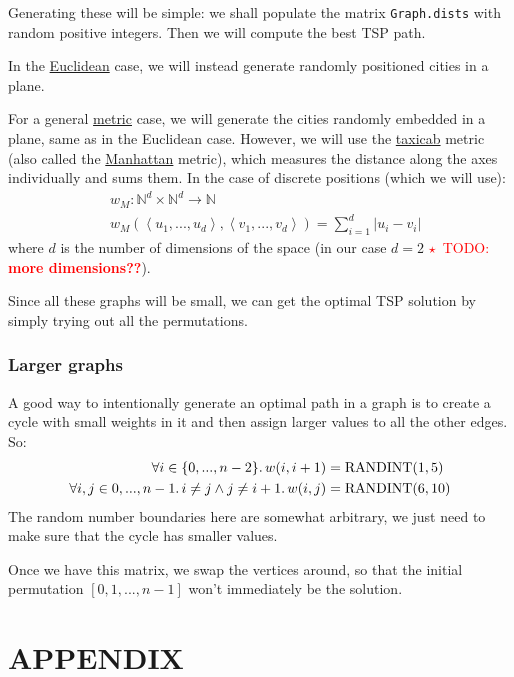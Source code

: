 \documentclass{article}
\newcommand{\todo}[1]{\textcolor{red}{$\star$~TODO: \textbf{#1}}}
\newcommand{\randint}{\operatorname{RANDINT}}
\newcommand{\uu}[1]{\underline{#1}}
\newcommand{\py}[1]{\lstinline[language=Python]{#1}}
\renewcommand{\thesection}{\Alph{section}}
\begin{document}
Generating these will be simple: we shall populate the matrix
\py{Graph.dists} with random positive integers. Then we will
compute the best TSP path.

In the \uu{Euclidean} case, we will instead generate randomly positioned
cities in a plane.

For a general \uu{metric} case, we will generate the cities randomly embedded
in a plane, same as in the Euclidean case. However, we will use
the \uu{taxicab} metric (also called the \uu{Manhattan} metric), which measures
the distance along the axes individually and sums them. In the case of discrete
positions (which we will use):
\begin{align*}
  & w_M: \mathbb{N}^d \times \mathbb{N}^d \to \mathbb{N} \\
  & w_M\left(\left<u_1,...,u_d\right>, \left<v_1,...,v_d\right>\right) = \sum_{i=1}^d \left|u_i - v_i\right|
\end{align*}
where $d$ is the number of dimensions of the space (in our case $d=2$
\todo{more dimensions??}).

Since all these graphs will be small, we can get the optimal TSP solution by
simply trying out all the permutations.

\subsubsection{Larger graphs}

A good way to intentionally generate an optimal path in a graph is to create
a cycle with small weights in it and then assign larger values to all the other
edges. So:
\begin{align*}\forall i\in\{0,...,n-2\}\ldotp w(i,i+1) & =\randint(1,5)\\
  \forall i,j\in{0,...,n-1}\ldotp i\ne j \wedge j\ne i+1 \ldotp
  w(i,j) & = \randint(6,10) \\
\end{align*}
The random number boundaries here are somewhat arbitrary, we just need to make
sure that the cycle has smaller values.

Once we have this matrix, we swap the vertices around, so that the initial
permutation $[0,1,...,n-1]$ won't immediately be the solution.


\appendix
\section*{APPENDIX}
\renewcommand{\thesection}{\roman{section}}
\end{document}

